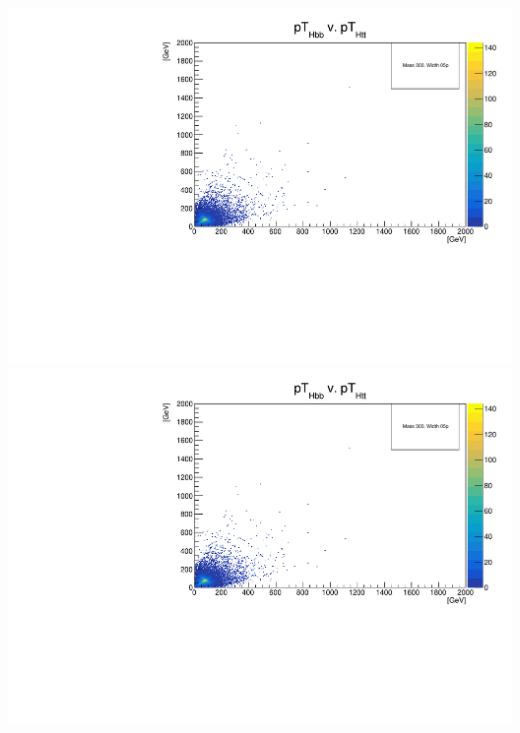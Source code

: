 \documentclass[a4wide,10pt]{article}
\begin{document}
\includegraphics[scale=0.50,page=40]{../Pdfs/2-D_Hbb(pT)_versus_Htt(pT)_VaryingWidths.pdf}
\includegraphics[scale=0.50,page=41]{../Pdfs/2-D_Hbb(pT)_versus_Htt(pT)_VaryingWidths.pdf}
\end{document}
